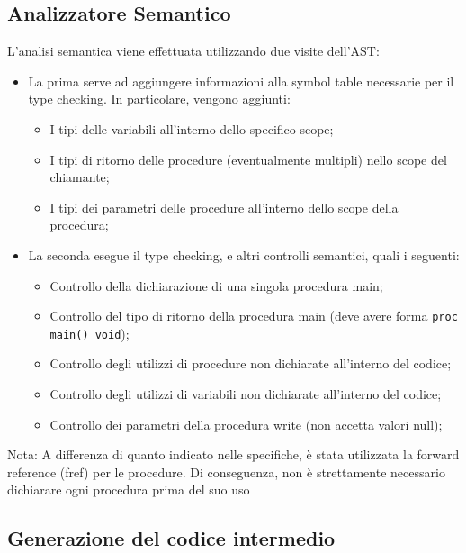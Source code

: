 \documentclass[a4paper,12pt]{article}
\begin{document}
	\subsection{Analizzatore Semantico}
	L'analisi semantica viene effettuata utilizzando due visite dell'AST:
	\begin{itemize}
		\item La prima serve ad aggiungere informazioni alla symbol table necessarie per il type checking. In particolare, vengono aggiunti:
			\begin{itemize}
				\item I tipi delle variabili all'interno dello specifico scope;
				\item I tipi di ritorno delle procedure (eventualmente multipli) nello scope del chiamante;
				\item I tipi dei parametri delle procedure all'interno dello scope della procedura;
			\end{itemize}

		\item La seconda esegue il type checking, e altri controlli semantici, quali i seguenti:
			\begin{itemize}
				\item Controllo della dichiarazione di una singola procedura main;
				\item Controllo del tipo di ritorno della procedura main (deve avere forma \texttt{proc main() void});
				\item Controllo degli utilizzi di procedure non dichiarate all'interno del codice;
				\item Controllo degli utilizzi di variabili non dichiarate all'interno del codice;
				\item Controllo dei parametri della procedura write (non accetta valori null);
			\end{itemize}
	\end{itemize}
	
	Nota: A differenza di quanto indicato nelle specifiche, è stata utilizzata la forward reference (fref) per le procedure. Di conseguenza, non è strettamente necessario dichiarare ogni procedura prima del suo uso\newpage

	\subsection{Generazione del codice intermedio}
\end{document}

